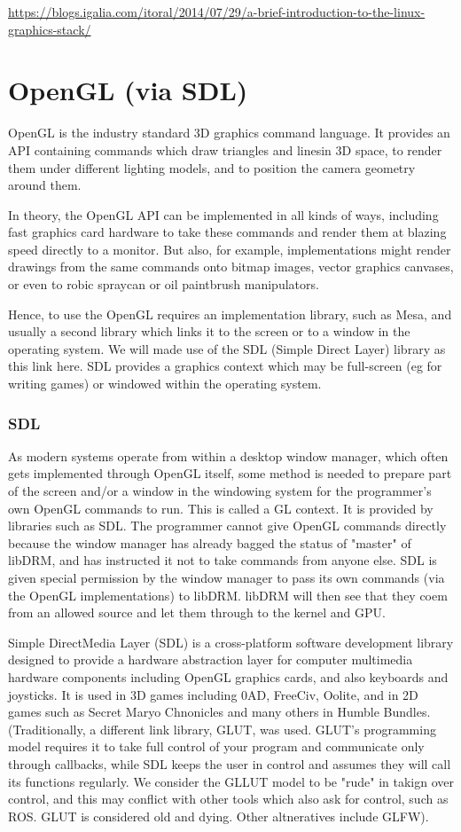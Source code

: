 \documentclass[oneside,english]{scrbook}
\begin{document}
\url{https://blogs.igalia.com/itoral/2014/07/29/a-brief-introduction-to-the-linux-graphics-stack/}


\chapter{OpenGL (via SDL)}

OpenGL is the industry standard 3D graphics command language.  It provides an API containing commands which draw triangles and linesin 3D space, to render them under different lighting models, and to position the camera geometry around them.

In theory, the OpenGL API can be implemented in all kinds of ways, including fast graphics card hardware to take these commands and render them at blazing speed directly to a monitor. But also, for example, implementations might render drawings from the same commands onto bitmap images, vector graphics canvases, or even to robic spraycan or oil paintbrush manipulators.

Hence, to use the OpenGL requires an implementation library, such as Mesa, and usually a second library which links it to the screen or to a window in the operating system.   We will made use of the SDL (Simple Direct Layer) library as this link here.   SDL provides a graphics context which may be full-screen (eg for writing games) or windowed within the operating system.   


\subsection{SDL}

As modern systems operate from within a desktop window manager, which often gets implemented through OpenGL itself, some method is needed to prepare part of the screen and/or a window in the windowing system for the programmer's own OpenGL commands to run.  This is called a GL context.  It is provided by libraries such as SDL.   The programmer cannot give OpenGL commands directly because the window manager has already bagged the status of "master" of libDRM, and has instructed it not to take commands from anyone else.  SDL is given special permission by the window manager to pass its own commands (via the OpenGL implementations) to libDRM.  libDRM will then see that they coem from an allowed source and let them through to the kernel and GPU.

Simple DirectMedia Layer (SDL) is a cross-platform software development library designed to provide a hardware abstraction layer for computer multimedia hardware components including OpenGL graphics cards, and also keyboards and joysticks.  It is used in 3D games including 0AD, FreeCiv, Oolite, and in 2D games such as Secret Maryo Chnonicles and many others in Humble Bundles.  (Traditionally, a different link library, GLUT, was used. GLUT's programming model requires it to take full control of your program and communicate only through callbacks, while SDL keeps the user in control and assumes they will call its functions regularly. We consider the GLLUT model to be "rude" in takign over control, and this may conflict with other tools which also ask for control, such as ROS.  GLUT is considered old and dying.  Other altneratives include GLFW).
\end{document}
